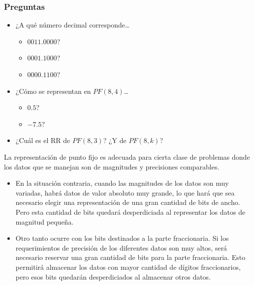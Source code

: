 \documentclass[spanish,A4,]{article}
\begin{document}
\subsubsection{Preguntas}\label{preguntas}

\begin{itemize}
\itemsep1pt\parskip0pt
\item
  ¿A qué número decimal corresponde\ldots{}

  \begin{itemize}
  \itemsep1pt\parskip0pt
  \item
    $0011.0000$?
  \item
    $0001.1000$?
  \item
    $0000.1100$?
  \end{itemize}
\item
  ¿Cómo se representan en $PF(8,4)$\ldots{}

  \begin{itemize}
  \itemsep1pt\parskip0pt
  \item
    $0.5$?
  \item
    $-7.5$?
  \end{itemize}
\item
  ¿Cuál es el RR de $PF(8,3)$? ¿Y de $PF(8,k)$?
\end{itemize}

La representación de punto fijo es adecuada para cierta clase de
problemas donde los datos que se manejan son de magnitudes y precisiones
comparables.

\begin{itemize}
\itemsep1pt\parskip0pt
\item
  En la situación contraria, cuando las magnitudes de los datos son muy
  variadas, habrá datos de valor absoluto muy grande, lo que hará que
  sea necesario elegir una representación de una gran cantidad de bits
  de ancho. Pero esta cantidad de bits quedará desperdiciada al
  representar los datos de magnitud pequeña.\\
\item
  Otro tanto ocurre con los bits destinados a la parte fraccionaria. Si
  los requerimientos de precisión de los diferentes datos son muy altos,
  será necesario reservar una gran cantidad de bits para la parte
  fraccionaria. Esto permitirá almacenar los datos con mayor cantidad de
  dígitos fraccionarios, pero esos bits quedarán desperdiciados al
  almacenar otros datos.
\end{itemize}
\end{document}
